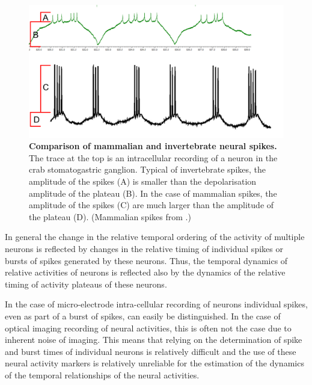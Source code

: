 \begin{figure}[H]
	\begin{center}
		\includegraphics[width=\columnwidth]{graphics/Spikes_comparison.png}
		\caption[Comparison of mammalian and invertebrate neural spikes. ]{\textbf{Comparison of mammalian and invertebrate neural spikes.} The trace at the top is an intracellular recording of a neuron in the crab stomatogastric ganglion. Typical of invertebrate spikes, the amplitude of the spikes (A) is smaller than the depolarisation amplitude of the plateau (B). In the case of mammalian spikes, the amplitude of the spikes (C) are much larger than the amplitude of the plateau (D). (Mammalian spikes from \cite{Wang1999}.)}
		\label{fig:spike_comparison}
	\end{center}
\end{figure}

In general the change in the relative temporal ordering of the activity of multiple neurons is reflected by changes in the relative timing of individual spikes or bursts of spikes generated by these neurons. Thus, the temporal dynamics of relative activities of neurons is reflected also by the dynamics of the relative timing of activity plateaus of these neurons.

In the case of micro-electrode intra-cellular recording of neurons individual spikes, even as part of a burst of spikes, can easily be distinguished. In the case of optical imaging recording of neural activities, this is often not the case due to inherent noise of imaging. This means that relying on the determination of spike and burst times of individual neurons is relatively difficult and the use of these neural activity markers is relatively unreliable for the estimation of the dynamics of the temporal relationships of the neural activities.

